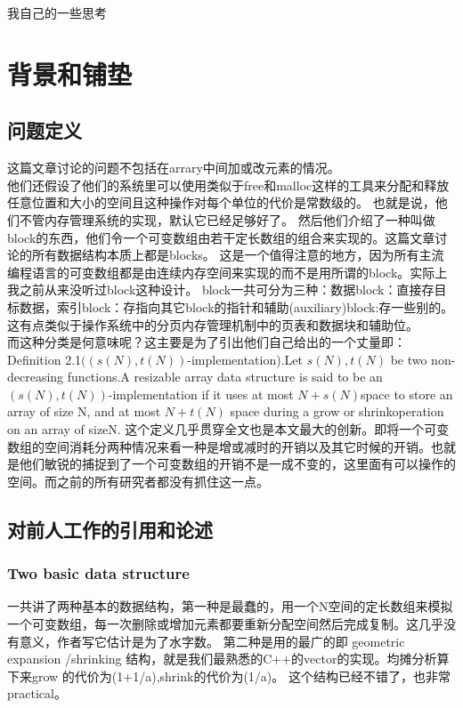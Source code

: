\documentclass[12pt,a4paper]{article}
\begin{document}
我自己的一些思考
\section{背景和铺垫}

\subsection{问题定义}
这篇文章讨论的问题不包括在arrary中间加或改元素的情况。\\
他们还假设了他们的系统里可以使用类似于free和malloc这样的工具来分配和释放任意位置和大小的空间且这种操作对每个单位的代价是常数级的。
也就是说，他们不管内存管理系统的实现，默认它已经足够好了。
然后他们介绍了一种叫做block的东西，他们令一个可变数组由若干定长数组的组合来实现的。这篇文章讨论的所有数据结构本质上都是blocks。
这是一个值得注意的地方，因为所有主流编程语言的可变数组都是由连续内存空间来实现的而不是用所谓的block。实际上我之前从来没听过block这种设计。
block一共可分为三种：数据block：直接存目标数据，索引block：存指向其它block的指针和辅助(auxiliary)block:存一些别的。这有点类似于操作系统中的分页内存管理机制中的页表和数据块和辅助位。\\
而这种分类是何意味呢？这主要是为了引出他们自己给出的一个丈量即：Definition  2.1$((s(N),t(N))$-implementation).Let $s(N),t(N)$ be  two  non-decreasing  functions.A  resizable  array  data  structure  is  said  to  be  
an$(s(N),t(N))$-implementation  if  it  uses  at  most  $N+s(N)$space to store an array of size N, and at most $N+t(N)$ space during a grow or shrinkoperation on an array of sizeN.
这个定义几乎贯穿全文也是本文最大的创新。即将一个可变数组的空间消耗分两种情况来看一种是增或减时的开销以及其它时候的开销。也就是他们敏锐的捕捉到了一个可变数组的开销不是一成不变的，这里面有可以操作的空间。而之前的所有研究者都没有抓住这一点。
\subsection{对前人工作的引用和论述}
\subsubsection{Two basic data structure}
一共讲了两种基本的数据结构，第一种是最蠢的，用一个N空间的定长数组来模拟一个可变数组，每一次删除或增加元素都要重新分配空间然后完成复制。这几乎没有意义，作者写它估计是为了水字数。
第二种是用的最广的即 geometric expansion /shrinking 结构，就是我们最熟悉的C++的vector的实现。均摊分析算下来grow 的代价为(1+1/a),shrink的代价为(1/a)。
这个结构已经不错了，也非常practical。
\end{document}
